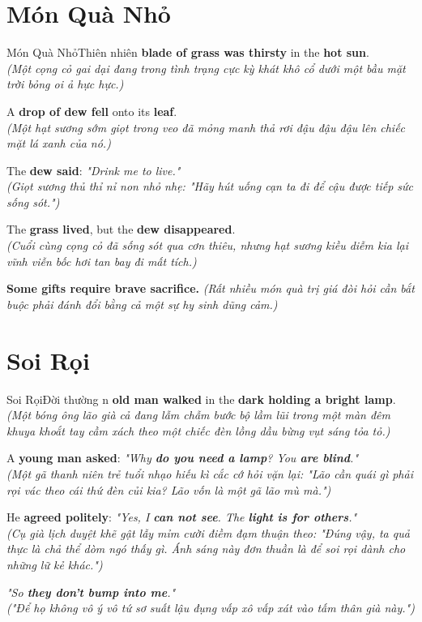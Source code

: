 \section{Món Quà Nhỏ}
\begin{truyen}{Món Quà Nhỏ}{Thiên nhiên}
 \textbf{blade of grass was thirsty} in the \textbf{hot sun}.\\
\textit{(Một cọng cỏ gai dại đang trong tình trạng cực kỳ khát khô cổ dưới một bầu mặt trời bỏng oi ả hực hực.)}

A \textbf{drop of dew fell} onto its \textbf{leaf}.\\
\textit{(Một hạt sương sớm giọt trong veo đã mỏng manh thả rơi đậu đậu đậu lên chiếc mặt lá xanh của nó.)}

The \textbf{dew said}: \textit{"Drink me to live."}\\
\textit{(Giọt sương thủ thỉ nỉ non nhỏ nhẹ: "Hãy hút uống cạn ta đi để cậu được tiếp sức sống sót.")}

The \textbf{grass lived}, but the \textbf{dew disappeared}.\\
\textit{(Cuổi cùng cọng cỏ đã sống sót qua cơn thiêu, nhưng hạt sương kiều diễm kia lại vĩnh viễn bốc hơi tan bay đi mất tích.)}
\end{truyen}

\begin{baihoc}
  \textbf{Some gifts require brave sacrifice.} \textit{(Rất nhiều món quà trị giá đòi hỏi cần bắt buộc phải đánh đổi bằng cả một sự hy sinh dũng cảm.)}
\end{baihoc}

\vspace{0.8cm}

\ngayDay{}
\section{Soi Rọi}
\begin{truyen}{Soi Rọi}{Đời thường}
n \textbf{old man walked} in the \textbf{dark holding a bright lamp}.\\
\textit{(Một bóng ông lão già cả đang lẫm chẫm bước bộ lầm lũi trong một màn đêm khuya khoắt tay cầm xách theo một chiếc đèn lồng dầu bừng vụt sáng tỏa tỏ.)}

A \textbf{young man asked}: \textit{"Why \textbf{do you need a lamp}? You \textbf{are blind}."}\\
\textit{(Một gã thanh niên trẻ tuổi nhạo hiếu kì cắc cớ hỏi vặn lại: "Lão cần quái gì phải rọi vác theo cái thứ đèn củi kia? Lão vốn là một gã lão mù mà.")}

He \textbf{agreed politely}: \textit{"Yes, I \textbf{can not see}. The \textbf{light is for others}."}\\
\textit{(Cụ già lịch duyệt khẽ gật lẫy mỉm cười điềm đạm thuận theo: "Đúng vậy, ta quả thực là chả thể dòm ngó thấy gì. Ánh sáng này đơn thuần là để soi rọi dành cho những lữ kẻ khác.")}

\textit{"So \textbf{they don't bump into me}."}\\
\textit{("Để họ không vô ý vô tứ sơ suất lậu đụng vấp xô vấp xát vào tấm thân già này.")}
\end{truyen}

